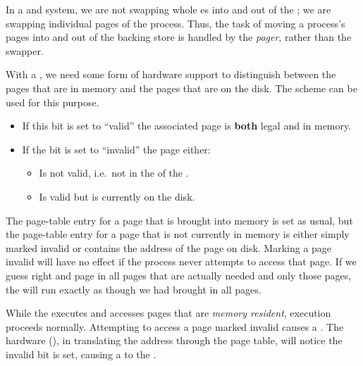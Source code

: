 \begin{definition}[Pager]\label{def:Pager}
  In a  and  system, we are not swapping whole es into and out of the ; we are swapping individual pages of the process.
  Thus, the task of moving a process's pages into and out of the backing store is handled by the \emph{pager}, rather than the swapper.
\end{definition}

With a , we need some form of hardware support to distinguish between the pages that are in memory and the pages that are on the disk.
The  scheme can be used for this purpose.
\begin{itemize}[noitemsep]
\item If this bit is set to ``valid'' the associated page is \textbf{both} legal and in memory.
\item If the bit is set to ``invalid'' the page either:
  \begin{itemize}[noitemsep]
  \item Is not valid, i.e.\ not in the  of the .
  \item Is valid but is currently on the disk.
  \end{itemize}
\end{itemize}

The page-table entry for a page that is brought into memory is set as usual, but the page-table entry for a page that is not currently in memory is either simply marked invalid or contains the address of the page on disk.
Marking a page invalid will have no effect if the process never attempts to access that page.
If we guess right and page in all pages that are actually needed and only those pages, the  will run exactly as though we had brought in all pages.

While the  executes and accesses pages that are \emph{memory resident}, execution proceeds normally.
Attempting to access a page marked invalid causes a .
The  hardware (), in translating the address through the page table, will notice the invalid bit is set, causing a  to the .

